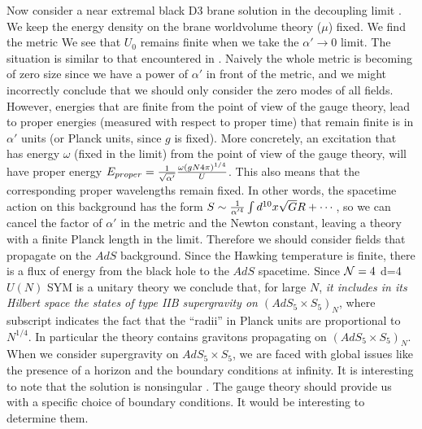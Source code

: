 Now consider a near extremal black D3 brane solution 
in the decoupling limit \decoupling . We  keep
the energy density  
on the brane worldvolume theory ($\mu$) fixed. 
We find the metric
\eqn{}
We see that $U_0$ remains  finite when we take
 the  $\alpha'\to 0$ limit.  The
situation is similar to that encountered in \msfive .
Naively the whole metric is becoming of zero size since 
we have a power of $\alpha'$ in front of the metric, and 
we might incorrectly conclude that we should only consider the
zero modes of all fields. 
However, energies that are finite from the point of view of the
gauge theory, lead to proper energies (measured with respect to proper
time)
that remain finite is 
in $\alpha'$ units (or Planck units, since $g$ is fixed). 
More concretely,  an excitation that has  energy $\omega$ (fixed in the
limit)
 from 
the point of view of the gauge theory, will have 
proper energy $ E_{proper} = { 1 \over \sqrt{\alpha'} }
{ \omega  (g N 4\pi)^{1/4}\over U} $. 
This also means that the corresponding proper wavelengths 
remain fixed. 
In other words, the spacetime action on this background  has the form 
$ S \sim { 1\over \alpha'^4} \int d^{10 }x \sqrt{G} R +\cdots $, 
so  we can cancel   the factor of $\alpha'$ in the metric and 
the Newton constant, leaving a theory with a finite Planck length in the
limit. Therefore
 we should consider fields that propagate on the $AdS$ background.
Since  the Hawking temperature is finite, 
there is a flux of energy from the black hole to the $AdS$ spacetime. 
%
Since ${\cal N} = 4$ d=4 $U(N)$ SYM is a unitary theory we conclude that,
for large $N$, 
{\it it includes in its Hilbert space the states of type IIB supergravity 
on 
$(AdS_5 \times S_5)_N$}, where subscript  indicates the fact that the 
``radii''  in Planck units are proportional to $N^{1/4}$.
In 
 particular the theory  contains  gravitons 
 propagating on $(AdS_5 \times S_5)_N$.
When we consider supergravity on  $AdS_5 \times S_5$, we are faced with 
global issues like the presence of a horizon and the
 boundary conditions  at infinity. It is interesting to note 
 that the solution is nonsingular \ght . 
 The gauge 
theory should provide us with a specific choice of boundary conditions.
It would be interesting to determine them. 

